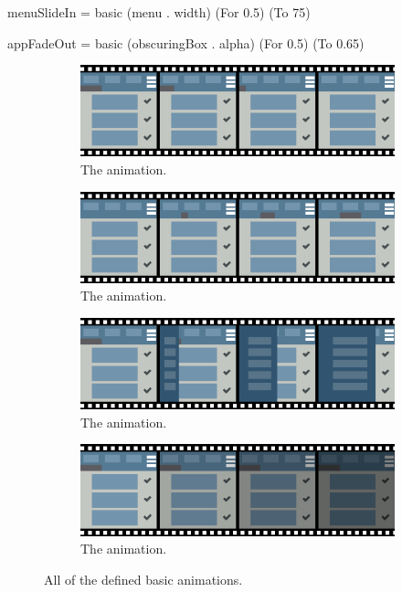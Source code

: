 \begin{spec}
menuSlideIn = basic (menu . width) (For 0.5) (To 75)

appFadeOut = basic (obscuringBox . alpha) (For 0.5) (To 0.65)
\end{spec}

\begin{figure}[!htbp]
\centering

\begin{subfigure}[h]{\textwidth}
\centering
\includegraphics[width=\figscale\textwidth]{pictures/line1OutroFig}
\caption{The  animation.}
\label{fig:basic1_1}
\end{subfigure}

\begin{subfigure}[h]{\textwidth}
\centering
\includegraphics[width=\figscale\textwidth]{pictures/line2IntroFig}
\caption{The  animation.}
\label{fig:basic1_2}
\end{subfigure}

\begin{subfigure}[h]{\textwidth}
\centering
\includegraphics[width=\figscale\textwidth]{pictures/menuSlideInFig}
\caption{The  animation.}
\label{fig:basic2_1}
\end{subfigure}

\begin{subfigure}[h]{\textwidth}
\centering
\includegraphics[width=\figscale\textwidth]{pictures/appFadeOutFig}
\caption{The  animation.}
\label{fig:basic2_2}
\end{subfigure}

\caption{All of the defined basic animations.}
\label{fig:basic}
\end{figure}

